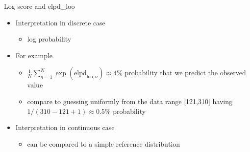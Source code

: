 \documentclass[english,t]{beamer}
\begin{document}
\begin{frame}{Log score and elpd\_loo}

  \begin{itemize}
  \item Interpretation in discrete case
    \begin{itemize}
    \item log probability
    \end{itemize}
  \item<2-> For example
    \begin{itemize}
    \item $\frac{1}{N}\sum_{n=1}^N\exp(\mathrm{elpd}_{\mathrm{loo},n}) \approx 4\%$ probability that we predict the
      observed value
    \item<3-> compare to guessing uniformly from the data range [121,310] having
      $1/(310-121+1) \approx 0.5\%$ probability 
    \end{itemize}
  \item<5-> Interpretation in continuous case
    \begin{itemize}
    \item can be compared to a simple reference distribution
    \end{itemize}
  \end{itemize}

\end{frame}
\end{document}

